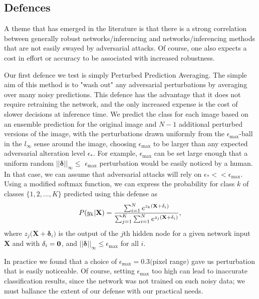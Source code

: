 \documentclass[conference]{IEEEtran}
\begin{document}
\subsection{Defences}

A theme that has emerged in the literature is that there is a strong
correlation between generally robust networks/inferencing and
networks/inferencing methods that are not easily swayed by adversarial
attacks. Of course, one also expects a cost in effort or accuracy to be
associated with increased robustness.

Our first defence we test is simply Perturbed Prediction Averaging. The
simple aim of this method is to "wash out" any adversarial perturbations by
averaging over many noisy predictions. This defence has the advantage that
it does not require retraining the network, and the only increased expense
is the cost of slower decisions at inference time. We predict the class for
each image based on an ensemble prediction for the original image and $N-1$
additional perturbed versions of the image, with the perturbations drawn
uniformly from the $\epsilon _{\max }$-ball in the $l_{\infty }$ sense
around the image, choosing $\epsilon _{\max }$ to be larger than any
expected adversarial alteration level $\epsilon _{\ast }$. For example, $%
\epsilon _{\max }$ can be set large enough that a uniform random $\left\vert
\left\vert \mathbf{\delta }\right\vert \right\vert _{\infty }\leq $ $%
\epsilon _{\max }$ perturbation would be easily noticed by a human. In that
case, we can assume that adversarial attacks will rely on $\epsilon _{\ast
}<<\epsilon _{\max }$. Using a modified softmax function, we can express the
probability for class $k$ of classes $\{1,2,...,K\}$ predicted using this
defense as%
\begin{equation*}
P(y_{k}\rvert \mathbf{X})=\frac{\sum_{i=1}^{N}e^{z_{k}(\mathbf{X}+\mathbf{%
\delta }_{i}\mathbf{)}}}{\sum_{j=1}^{K}\sum_{i=1}^{N}e^{z_{j}(\mathbf{X}+%
\mathbf{\delta }_{i}\mathbf{)}}},
\end{equation*}%
where $z_{j}(\mathbf{X}+\mathbf{\delta }_{i}\mathbf{)}$ is the output of the 
$j$th hidden node for a given network input $\mathbf{X}$ and with $\mathbf{%
\delta }_{i}=\mathbf{0}$, and $\left\vert \left\vert \mathbf{\delta }%
\right\vert \right\vert _{\infty }\leq \epsilon _{\max }$ for all $i$.

In practice we found that a choice of $\epsilon _{\max }=0.3($pixel range$)$
gave us perturbation that is easily noticeable. Of course, setting $\epsilon
_{\max }$ too high can lead to inaccurate classification results, since the
network was not trained on such noisy data; we must ballance the extent of
our defense with our practical needs.
\end{document}
